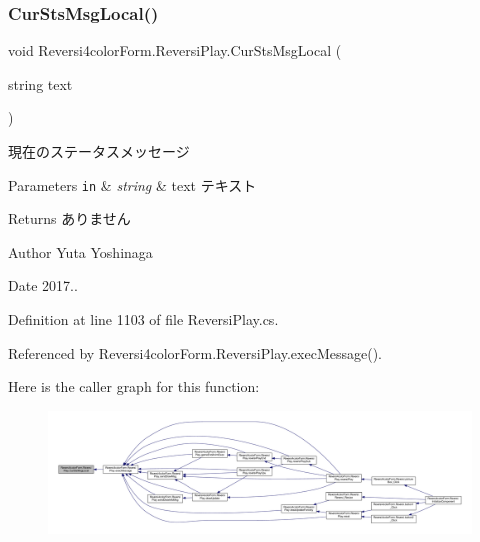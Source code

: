 \subsubsection{\texorpdfstring{Cur\+Sts\+Msg\+Local()}{CurStsMsgLocal()}}
{\footnotesize\ttfamily void Reversi4color\+Form.\+Reversi\+Play.\+Cur\+Sts\+Msg\+Local (\begin{DoxyParamCaption}\item[{string}]{text }\end{DoxyParamCaption})\hspace{0.3cm}{\ttfamily [private]}}



現在のステータスメッセージ 


\begin{DoxyParams}[1]{Parameters}
\mbox{\tt in}  & {\em string} & text テキスト \\
\hline
\end{DoxyParams}
\begin{DoxyReturn}{Returns}
ありません 
\end{DoxyReturn}
\begin{DoxyAuthor}{Author}
Yuta Yoshinaga 
\end{DoxyAuthor}
\begin{DoxyDate}{Date}
2017.. 
\end{DoxyDate}


Definition at line 1103 of file Reversi\+Play.\+cs.



Referenced by Reversi4color\+Form.\+Reversi\+Play.\+exec\+Message().

Here is the caller graph for this function\+:\nopagebreak
\begin{figure}[H]
\begin{center}
\leavevmode
\includegraphics[width=350pt]{class_reversi4color_form_1_1_reversi_play_ada1cd7e7bcfaadc34f40a59aee12aa50_icgraph}
\end{center}
\end{figure}
\mbox{\label{class_reversi4color_form_1_1_reversi_play_aad21cdb2b475bc1d65ab32bca755f24f}} 
